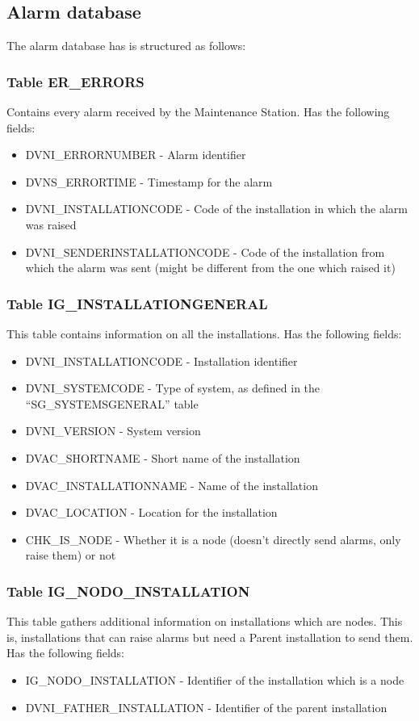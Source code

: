 \documentclass[a4paper,10pt]{article}
\begin{document}
\subsection{Alarm database}
The alarm database has is structured as follows:
\subsubsection*{Table ER\_ERRORS}
Contains every alarm received by the Maintenance Station. Has the following fields:
\begin{itemize}
 \item DVNI\_ERRORNUMBER - Alarm identifier
 \item DVNS\_ERRORTIME - Timestamp for the alarm
 \item DVNI\_INSTALLATIONCODE - Code of the installation in which the alarm was raised
 \item DVNI\_SENDERINSTALLATIONCODE - Code of the installation from which the alarm was sent (might be different from the one which raised it)
\end{itemize}

\subsubsection*{Table IG\_INSTALLATIONGENERAL}
This table contains information on all the installations. Has the following fields:
\begin{itemize}
 \item DVNI\_INSTALLATIONCODE - Installation identifier
 \item DVNI\_SYSTEMCODE - Type of system, as defined in the ``SG\_SYSTEMSGENERAL'' table
 \item DVNI\_VERSION - System version
 \item DVAC\_SHORTNAME - Short name of the installation
 \item DVAC\_INSTALLATIONNAME - Name of the installation
 \item DVAC\_LOCATION - Location for the installation
 \item CHK\_IS\_NODE - Whether it is a node (doesn't directly send alarms, only raise them) or not
\end{itemize}

\subsubsection*{Table IG\_NODO\_INSTALLATION}
This table gathers additional information on installations which are nodes. This is, installations that can raise alarms but need a Parent installation to send them. Has the following fields:
\begin{itemize}
 \item IG\_NODO\_INSTALLATION - Identifier of the installation which is a node
 \item DVNI\_FATHER\_INSTALLATION - Identifier of the parent installation
\end{itemize}
\end{document}
